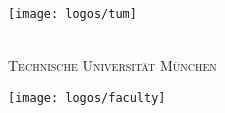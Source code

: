 \thispagestyle{empty}

\vspace{40mm}
\begin{center}
  \texttt{[image: logos/tum]}

  \vspace{5mm}
  \Huge \textsc{\getFaculty{}}\\
  \vspace{5mm}
  \Large \textsc{Technische Universität München}\\
  \vspace{1mm}
\end{center}

\vspace{15mm}

\begin{center}
  {\Large \getDoctype{}}

  \vspace{20mm}

  {\huge\bfseries \getTitle{}}

  \vspace{15mm}

  {\LARGE \getAuthor{}}

  \vspace{20mm}

  \texttt{[image: logos/faculty]}
\end{center}

\cleardoublepage{}
